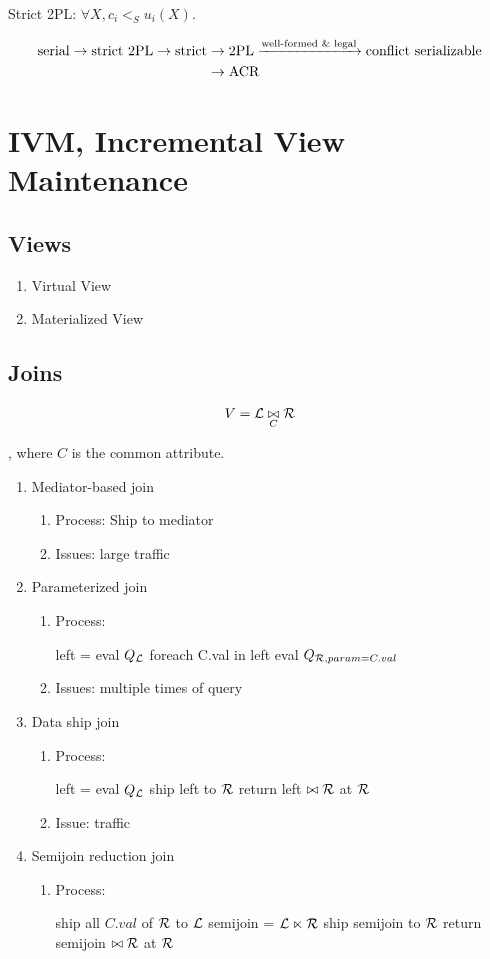 \documentclass[a4paper]{report}
\begin{document}
Strict 2PL: $\forall X, c_i <_S u_i(X)$. 

\begin{align*}
\text{serial} \rightarrow \text{strict 2PL} \rightarrow \text{strict} &\rightarrow \text{2PL} \xrightarrow{\text{well-formed \& legal}}\text{conflict serializable}\\
&\rightarrow \text{ACR} 
\end{align*}
\chapter{IVM, Incremental View Maintenance}
\section{Views}
\begin{enumerate}
\item Virtual View
\item Materialized View
\end{enumerate}


\section{Joins}
$$
V = \mathcal{L} \underset{C}\bowtie \mathcal{R}
$$

, where $C$ is the common attribute. 
\begin{enumerate}
\item Mediator-based join
\begin{enumerate}
\item Process: Ship to mediator
\item Issues: large traffic 
\end{enumerate}
\item Parameterized join
\begin{enumerate}
\item Process:
\begin{pseudo}
left = eval $Q_{\mathcal{L}}$
foreach C.val in left
  eval $Q_{\mathcal{R}, param=C.val}$
\end{pseudo}
\item Issues: multiple times of query
\end{enumerate}
\item Data ship join
\begin{enumerate}
\item Process:
\begin{pseudo}
left = eval $Q_{\mathcal{L}}$
ship left to $\mathcal{R}$
return left $\bowtie \mathcal{R}$ at $\mathcal{R}$
\end{pseudo}
\item Issue: traffic 
\end{enumerate}
\item Semijoin reduction join 
\begin{enumerate}
\item Process:
\begin{pseudo}
ship all $C.val$ of $\mathcal{R}$ to $\mathcal{L}$
semijoin = $\mathcal{L} \ltimes \mathcal{R}$
ship semijoin to $\mathcal{R}$
return semijoin $\bowtie \mathcal{R}$ at $\mathcal{R}$
\end{pseudo}
\end{enumerate}
\end{enumerate}
\end{document}
